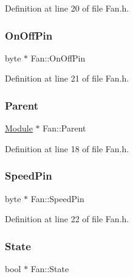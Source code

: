 Definition at line 20 of file Fan.\+h.

\mbox{\label{class_fan_afceba9bad8155187a7f2aea415f46a79}} 
\subsubsection{\texorpdfstring{On\+Off\+Pin}{OnOffPin}}
{\footnotesize\ttfamily byte $\ast$ Fan\+::\+On\+Off\+Pin\hspace{0.3cm}{\ttfamily [protected]}}



Definition at line 21 of file Fan.\+h.

\mbox{\label{class_fan_ab57a7efd60bf06472195dd1d63f0017f}} 
\subsubsection{\texorpdfstring{Parent}{Parent}}
{\footnotesize\ttfamily \hyperlink{class_module}{Module} $\ast$ Fan\+::\+Parent\hspace{0.3cm}{\ttfamily [protected]}}



Definition at line 18 of file Fan.\+h.

\mbox{\label{class_fan_ade9d2ab9b86bc3866a65f30e1964b746}} 
\subsubsection{\texorpdfstring{Speed\+Pin}{SpeedPin}}
{\footnotesize\ttfamily byte $\ast$ Fan\+::\+Speed\+Pin\hspace{0.3cm}{\ttfamily [protected]}}



Definition at line 22 of file Fan.\+h.

\mbox{\label{class_fan_afa0b370b3ffa913fdc1d5f06db1e06e3}} 
\subsubsection{\texorpdfstring{State}{State}}
{\footnotesize\ttfamily bool $\ast$ Fan\+::\+State\hspace{0.3cm}{\ttfamily [protected]}}



